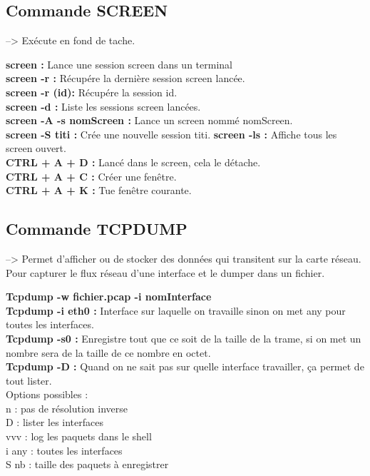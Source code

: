 \documentclass[a4paper]{article}
\begin{document}
		\subsection{Commande SCREEN}
		
--> 	Exécute en fond de tache.

\noindent
\textbf{screen :}  Lance une session screen dans un terminal\\
\textbf{screen -r :}	 Récupére la dernière session screen lancée. \\
\textbf{screen -r (id):}	Récupére la session id. \\
\textbf{screen -d :}	 Liste les sessions screen lancées. \\
\textbf{screen -A -s nomScreen :} Lance un screen nommé nomScreen. \\	
\textbf{screen -S titi :} Crée une nouvelle session titi.		
\textbf{screen -ls :} Affiche tous les screen ouvert.\\

\noindent
\textbf{CTRL + A + D :} Lancé dans le screen, cela le détache. \\
\textbf{CTRL + A + C :} Créer une fenêtre. \\	
\textbf{CTRL + A + K :} Tue fenêtre courante. \\


		\subsection{Commande TCPDUMP}
		
--> 	Permet d'afficher ou de stocker des données qui transitent sur la carte réseau. Pour capturer le flux réseau d'une interface et le dumper dans un fichier.

\noindent
\textbf{Tcpdump -w fichier.pcap -i nomInterface} \\
\textbf{Tcpdump -i eth0 :} Interface sur laquelle on travaille sinon on met any pour toutes les interfaces.\\
\textbf{Tcpdump -s0 :} Enregistre tout que ce soit de la taille de la trame, si on met un nombre sera de la taille de ce nombre en octet. \\
\textbf{Tcpdump -D :} Quand on ne sait pas sur quelle interface travailler, ça permet de tout lister. \\

Options possibles : \\
n : pas de résolution inverse\\
D : lister les interfaces \\
vvv : log les paquets dans le shell \\
i any : toutes les interfaces \\
S nb : taille des paquets à enregistrer \\
	
\end{document}
